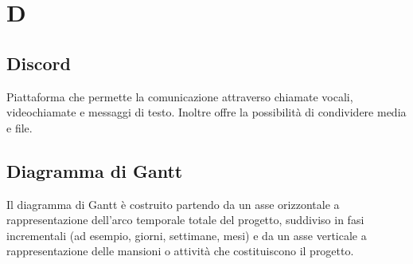 \section{D}
\subsection{Discord}%
Piattaforma che permette la comunicazione attraverso chiamate vocali, videochiamate e messaggi di testo.  Inoltre offre la possibilità di condividere media e file.
\subsection{Diagramma di Gantt}%
Il diagramma di Gantt è costruito partendo da un asse orizzontale a rappresentazione dell'arco temporale totale del progetto, suddiviso in fasi incrementali (ad esempio, giorni, settimane, mesi) e da un asse verticale a rappresentazione delle mansioni o attività che costituiscono il progetto.
\clearpage